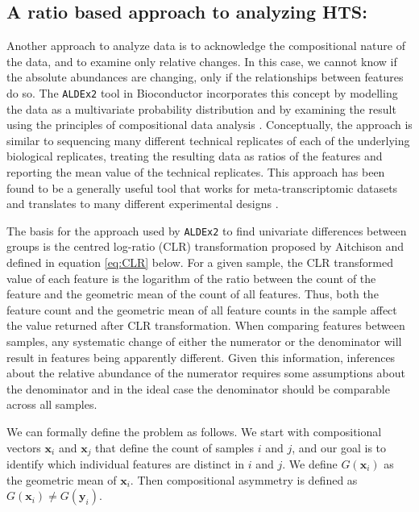 \documentclass[graybox]{svmult}
\begin{document}
\subsection*{A ratio based approach to analyzing HTS:}
\label{subsec:1:1}
Another approach to analyze data is to acknowledge the compositional nature of the data, and to examine only relative changes. In this case, we cannot know if the absolute abundances are changing, only if the relationships between features do so. The \texttt{ALDEx2} tool in Bioconductor incorporates this concept by modelling the data as a multivariate probability distribution and by examining the result using the principles of compositional data analysis \cite{Aitchison:1986,fernandes:2013}. Conceptually, the approach is similar to sequencing many different technical replicates of each of the underlying biological replicates, treating the resulting data as ratios of the features and reporting the mean value of the technical replicates. This approach has been found to be a generally useful tool that works for meta-transcriptomic datasets \cite{macklaim:2013} and translates to many different experimental designs \cite{fernandes:2014, mcmurrough:2014,gloorFrontiers:2017,Macklaim:2018aa,Almeida:2019aa}. 

The basis for the approach used by \texttt{ALDEx2} to find univariate differences between groups is the centred log-ratio (CLR) transformation proposed by Aitchison \cite{Aitchison:1986} and defined in equation \ref{eq:CLR} below.  For a given sample, the CLR transformed value of each feature is the logarithm of the ratio between the count of the feature and the geometric mean of the count of all features. Thus, both the feature count and the geometric mean of  all feature counts in the sample affect the value returned after CLR transformation. When comparing features between samples, any systematic change  of either the numerator or the denominator will result in features being apparently different. Given this information, inferences about the relative abundance of the numerator requires some assumptions about the denominator and in the ideal case the denominator should be comparable across all samples. 

We can formally define the problem as follows. We start with compositional vectors $\textbf{x}_i$ and $\textbf{x}_j$ that define the count of samples $i$ and $j$, and our goal is to identify which individual features are distinct in $i$ and $j$. We define $G(\textbf{x}_i)$ as the geometric mean of $\textbf{x}_i$. Then compositional asymmetry is defined as  $G(\textbf{x}_i) \ne G(\textbf{y}_i)$. 
\end{document}
